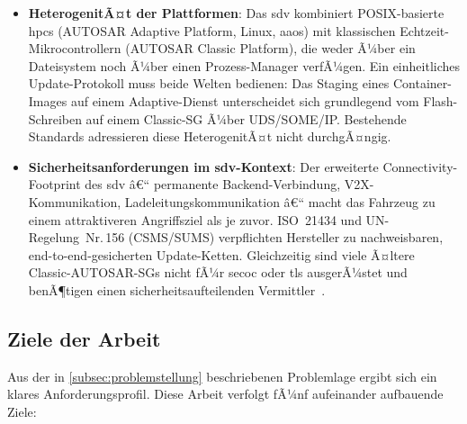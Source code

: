 ﻿\documentclass[12pt,a4paper,twoside]{article}
\begin{document}
\begin{itemize}[leftmargin=*]
  \item \textbf{HeterogenitÃ¤t der Plattformen}:
    Das \gls{sdv} kombiniert POSIX-basierte \glspl{hpc} (AUTOSAR Adaptive
    Platform, Linux, \gls{aaos}) mit klassischen Echtzeit-Mikrocontrollern
    (AUTOSAR Classic Platform), die weder Ã¼ber ein Dateisystem noch
    Ã¼ber einen Prozess-Manager verfÃ¼gen. Ein einheitliches Update-Protokoll
    muss beide Welten bedienen: Das Staging eines Container-Images auf
    einem Adaptive-Dienst unterscheidet sich grundlegend vom Flash-Schreiben
    auf einem Classic-SG Ã¼ber UDS/SOME/IP. Bestehende Standards adressieren
    diese HeterogenitÃ¤t nicht durchgÃ¤ngig.

  \item \textbf{Sicherheitsanforderungen im \gls{sdv}-Kontext}:
    Der erweiterte Connectivity-Footprint des \gls{sdv} â€“ permanente
    Backend-Verbindung, V2X-Kommunikation, Ladeleitungskommunikation â€“ macht
    das Fahrzeug zu einem attraktiveren Angriffsziel als je zuvor.
    ISO~21434 und UN-Regelung~Nr.\,156 (CSMS/SUMS) verpflichten
    Hersteller zu nachweisbaren, end-to-end-gesicherten Update-Ketten.
    Gleichzeitig sind viele Ã¤ltere Classic-AUTOSAR-SGs nicht fÃ¼r
    \gls{secoc} oder \gls{tls} ausgerÃ¼stet und benÃ¶tigen einen
    sicherheitsaufteilenden Vermittler~\cite{zelle2020security}.
\end{itemize}

\subsection{Ziele der Arbeit}
\label{subsec:ziele}

Aus der in \cref{subsec:problemstellung} beschriebenen Problemlage
ergibt sich ein klares Anforderungsprofil. Diese Arbeit verfolgt
fÃ¼nf aufeinander aufbauende Ziele:
\end{document}
